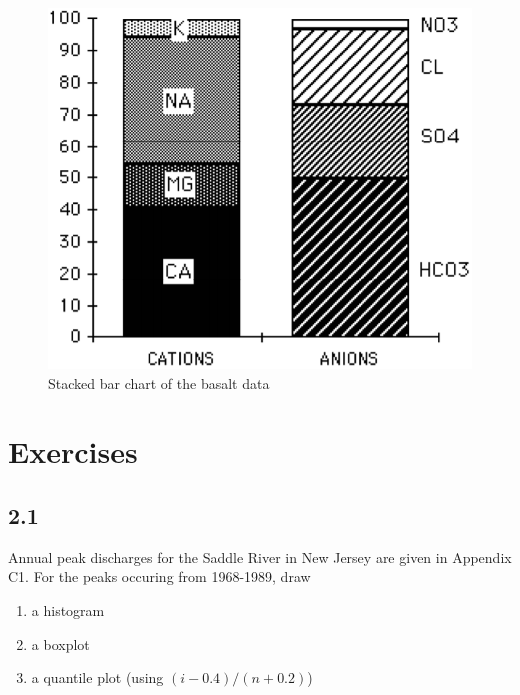 \documentclass[]{book}
\providecommand{\tightlist}{%
  \setlength{\itemsep}{0pt}\setlength{\parskip}{0pt}}
\begin{document}
\begin{figure}

{\centering \includegraphics[width=9.17in]{figures/2_40} 

}

\caption{Stacked bar chart of the basalt data}\label{fig:fig-2-40}
\end{figure}

\hypertarget{exercises-1}{%
\section*{Exercises}\label{exercises-1}}

\hypertarget{section-3}{%
\subsection*{2.1}\label{section-3}}

Annual peak discharges for the Saddle River in New Jersey are given in Appendix C1. For the peaks occuring from 1968-1989, draw

\begin{enumerate}
\def\labelenumi{\alph{enumi}.}
\tightlist
\item
  a histogram
\item
  a boxplot
\item
  a quantile plot (using \((i − 0.4)/(n + 0.2)\))
\end{enumerate}
\end{document}
